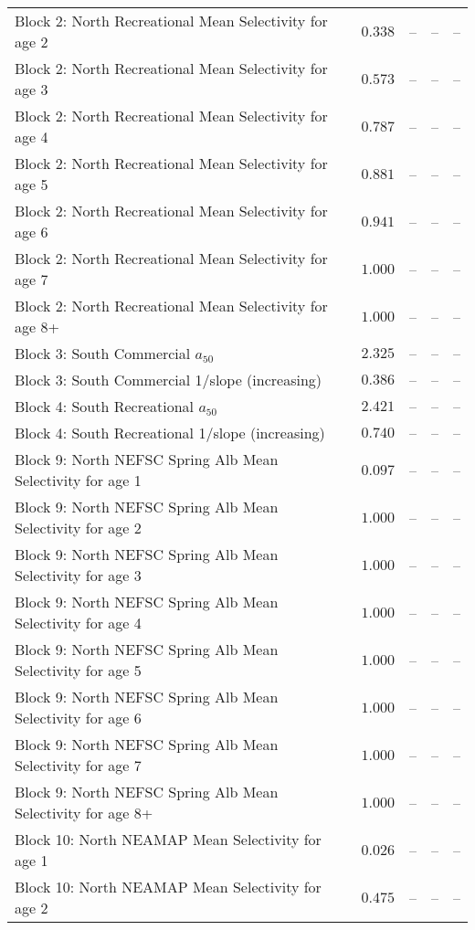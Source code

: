 \documentclass[
]{article}
\begin{document}
\begin{landscape}
\begin{longtable}[t]{lrrrr}
\addlinespace
Block 2: North Recreational Mean Selectivity for age 2 & $0.338$ & -- & -- & --\\
Block 2: North Recreational Mean Selectivity for age 3 & $0.573$ & -- & -- & --\\
Block 2: North Recreational Mean Selectivity for age 4 & $0.787$ & -- & -- & --\\
Block 2: North Recreational Mean Selectivity for age 5 & $0.881$ & -- & -- & --\\
Block 2: North Recreational Mean Selectivity for age 6 & $0.941$ & -- & -- & --\\
\addlinespace
Block 2: North Recreational Mean Selectivity for age 7 & $1.000$ & -- & -- & --\\
Block 2: North Recreational Mean Selectivity for age 8+ & $1.000$ & -- & -- & --\\
Block 3: South Commercial $a_{50}$ & $2.325$ & -- & -- & --\\
Block 3: South Commercial 1/slope (increasing) & $0.386$ & -- & -- & --\\
Block 4: South Recreational $a_{50}$ & $2.421$ & -- & -- & --\\
\addlinespace
Block 4: South Recreational 1/slope (increasing) & $0.740$ & -- & -- & --\\
Block 9: North NEFSC Spring Alb Mean Selectivity for age 1 & $0.097$ & -- & -- & --\\
Block 9: North NEFSC Spring Alb Mean Selectivity for age 2 & $1.000$ & -- & -- & --\\
Block 9: North NEFSC Spring Alb Mean Selectivity for age 3 & $1.000$ & -- & -- & --\\
Block 9: North NEFSC Spring Alb Mean Selectivity for age 4 & $1.000$ & -- & -- & --\\
\addlinespace
Block 9: North NEFSC Spring Alb Mean Selectivity for age 5 & $1.000$ & -- & -- & --\\
Block 9: North NEFSC Spring Alb Mean Selectivity for age 6 & $1.000$ & -- & -- & --\\
Block 9: North NEFSC Spring Alb Mean Selectivity for age 7 & $1.000$ & -- & -- & --\\
Block 9: North NEFSC Spring Alb Mean Selectivity for age 8+ & $1.000$ & -- & -- & --\\
Block 10: North NEAMAP Mean Selectivity for age 1 & $0.026$ & -- & -- & --\\
\addlinespace
Block 10: North NEAMAP Mean Selectivity for age 2 & $0.475$ & -- & -- & --\\

\end{longtable}
\end{landscape}
\end{document}
